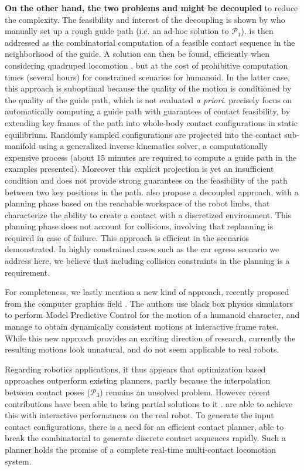 \textbf{On the other hand, the two problems \Pa and \Pb might be decoupled} to reduce the complexity. The feasibility and interest of the decoupling is shown by \citeauthor{DBLP:conf/iser/EscandeKMG08} who manually set up a rough guide path (i.e. an ad-hoc solution to $\mathcal{P}_1$). \Pb  is then addressed as the combinatorial computation of a feasible contact sequence in the neighborhood of the guide. A solution can then be found, efficiently when considering quadruped locomotion \citep{kalakrishnan2011learning}, but at the cost of prohibitive computation times (several hours) for constrained scenarios for humanoid. In the latter case, this approach is suboptimal because the quality of the motion is conditioned by the quality of the guide path,  which is not evaluated \textit{a priori}. \citeauthor{Bouyarmane2009} precisely focus on automatically computing a guide path with guarantees of contact feasibility, by extending key frames of the path into whole-body contact configurations in static equilibrium. Randomly sampled configurations are projected into the contact sub-manifold using a generalized inverse kinematics solver, a computationally expensive process (about 15 minutes are required to compute a guide path in the examples presented). Moreover this explicit projection is yet an insufficient condition and does not provide strong guarantees on the feasibility of the path between two key positions in the path. \citeauthor{7140082} also propose a decoupled approach, with a planning phase based on the reachable workspace of the robot limbs, that characterize the ability to create a contact with 
a discretized environment. This planning phase does not account for collisions, involving that replanning is required in case of failure. This approach is efficient 
in the scenarios demonstrated. In highly constrained cases such 
as the car egress scenario we address here, we believe that including collision constraints in the planning is a requirement.

For completeness, we lastly mention a new kind of approach, recently proposed from the computer graphics field \citep{hamalainen_cpbp_2015}. The authors
use black box physics simulators to perform Model Predictive Control for the motion of a humanoid character, and manage to obtain dynamically consistent motions
at \gls{interactive} frame rates. While this new approach provides an exciting direction of research, currently the resulting motions
look unnatural, and do not seem applicable to real robots.

Regarding robotics applications, it thus appears that optimization based approaches outperform existing planners,
partly because the interpolation between contact poses ($\mathcal{P}_3$) remains an unsolved problem.
However recent contributions have been able to bring partial solutions to it \citep{Hauser2014, herzog2015trajectory, Park116, Carpentier2016}. \citeauthor{Carpentier2016} are able to achieve this with \gls{interactive} performances on the real robot.
To generate the input contact configurations, there is a need for an efficient contact planner, able to break the combinatorial to generate discrete contact sequences rapidly. Such a planner holds the promise of a complete real-time multi-contact locomotion system.

